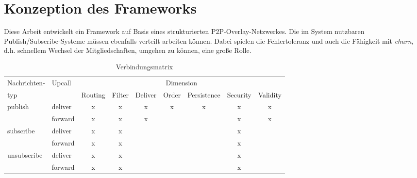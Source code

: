 \chapter{Konzeption des Frameworks}
\label{chap:konzeption_pubsub}
Diese Arbeit entwickelt ein Framework auf Basis eines strukturierten P2P-Overlay-Netzwerkes. Die im System nutzbaren Publish/Subscribe-Systeme müssen ebenfalls verteilt arbeiten können. Dabei spielen die Fehlertoleranz und auch die Fähigkeit mit \emph{churn}, d.h. schnellem Wechsel der Mitgliedschaften, umgehen zu können, eine große Rolle.

\begin{table}[!h]
\caption{Verbindungsmatrix}
\label{tab:konzeption_pubsub:verbindungsmatrix}
\begin{tabular}{llccccccc}
\toprule
Nachrichten- & Upcall	& \multicolumn{7}{c}{Dimension} \\
\cmidrule{3-9}
typ				&		& Routing & Filter & Deliver & Order & Persistence & Security & Validity \\
\midrule
publish	    & deliver & x & x & x & x & x & x & x \\
\cmidrule{2-9}
					  & forward & x & x & x &   &   & x & x \\
\midrule
subscribe	  & deliver & x & x &   &   &   & x & \\
\cmidrule{2-9}
			      & forward & x & x &   &   &   & x & \\
\midrule
unsubscribe & deliver & x & x &   &   &   & x & \\
\cmidrule{2-9}
      & forward & x & x &   &   &   & x & \\
\bottomrule
\end{tabular}
\end{table}






\cite{BeFiMu2006PubSubQoS}


\cite{KostasKatrinis2005}
